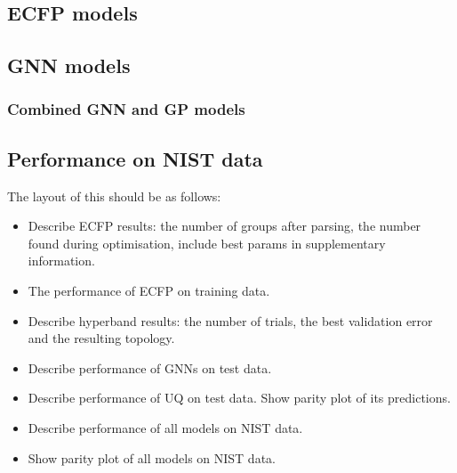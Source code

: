 \subsection{ECFP models}



\subsection{GNN models}

\subsubsection{Combined GNN and GP models}

\subsection{Performance on NIST data}

The layout of this should be as follows:
\begin{itemize}
    \item Describe ECFP results: the number of groups after parsing, the number found during optimisation, include best params in supplementary information.
    \item The performance of ECFP on training data.
    \item Describe hyperband results: the number of trials, the best validation error and the resulting topology.
    \item Describe performance of GNNs on test data.
    \item Describe performance of UQ on test data. Show parity plot of its predictions.
    \item Describe performance of all models on NIST data.
    \item Show parity plot of all models on NIST data.
\end{itemize}
